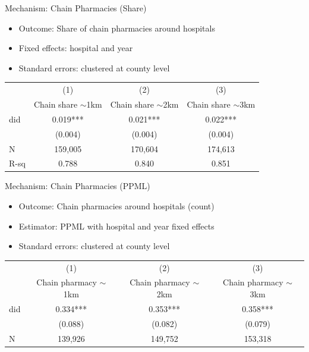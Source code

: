 \documentclass{beamer}
\begin{document}
\begin{frame}{Mechanism: Chain Pharmacies (Share)}

\begin{itemize}
    \item Outcome: Share of chain pharmacies around hospitals 
    \item Fixed effects: hospital and year
    \item Standard errors: clustered at county level
\end{itemize}

\vspace{0.5em}
\centering
\footnotesize
\begin{tabular}{lccc}
\hline
\hline
 & (1) & (2) & (3) \\
 & Chain share $\sim$1km & Chain share $\sim$2km & Chain share $\sim$3km \\
\hline
did & 0.019*** & 0.021*** & 0.022*** \\
    & (0.004)  & (0.004)  & (0.004)  \\
\hline
N   & 159,005  & 170,604  & 174,613  \\
R-sq & 0.788   & 0.840    & 0.851    \\
\hline
\hline
\end{tabular}


\end{frame}

\begin{frame}{Mechanism: Chain Pharmacies (PPML)}

\begin{itemize}
    \item Outcome: Chain pharmacies around hospitals (count)
    \item Estimator: PPML with hospital and year fixed effects
    \item Standard errors: clustered at county level
\end{itemize}

\vspace{0.5em}
\centering
\footnotesize
\begin{tabular}{lccc}
\hline
\hline
 & (1) & (2) & (3) \\
 & Chain pharmacy $\sim$1km & Chain pharmacy $\sim$2km & Chain pharmacy $\sim$3km \\
\hline
did & 0.334*** & 0.353*** & 0.358*** \\
    & (0.088)  & (0.082)  & (0.079)  \\
\hline
N   & 139,926  & 149,752  & 153,318  \\
\hline
\hline
\end{tabular}


\end{frame}
\end{document}
